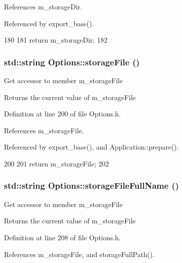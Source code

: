 References m\_\-storageDir.

Referenced by export\_\-base().


\begin{DoxyCode}
180                                {
181                 return m_storageDir;
182         }
\end{DoxyCode}
\hypertarget{classOptions_a6661fe4edd501f7e97527b8f9354ef84}{
\subsubsection[{storageFile}]{\setlength{\rightskip}{0pt plus 5cm}std::string Options::storageFile ()}}
\label{classOptions_a6661fe4edd501f7e97527b8f9354ef84}
Get accessor to member m\_\-storageFile \begin{DoxyReturn}{Returns}
the current value of m\_\-storageFile 
\end{DoxyReturn}


Definition at line 200 of file Options.h.

References m\_\-storageFile.

Referenced by export\_\-base(), and Application::prepare().


\begin{DoxyCode}
200                                 {
201                 return m_storageFile;
202         }
\end{DoxyCode}
\hypertarget{classOptions_a68c501133588cd4b1c80219adb926e8d}{
\subsubsection[{storageFileFullName}]{\setlength{\rightskip}{0pt plus 5cm}std::string Options::storageFileFullName ()}}
\label{classOptions_a68c501133588cd4b1c80219adb926e8d}
Get accessor to member m\_\-storageFile \begin{DoxyReturn}{Returns}
the current value of m\_\-storageFile 
\end{DoxyReturn}


Definition at line 208 of file Options.h.

References m\_\-storageFile, and storageFullPath().

